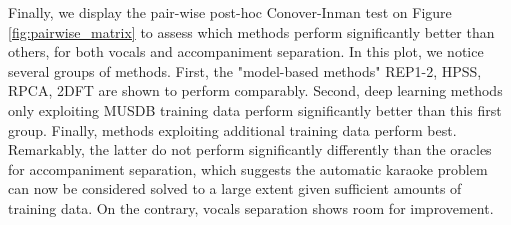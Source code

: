 \documentclass{llncs}
\begin{document}
Finally, we display the pair-wise post-hoc Conover-Inman test on Figure \ref{fig:pairwise_matrix} to assess which methods perform significantly better than others, for both vocals and accompaniment separation. In this plot, we notice several groups of methods. First, the "model-based methods" REP1-2, HPSS, RPCA, 2DFT are shown to perform comparably. Second, deep learning methods only exploiting MUSDB training data perform significantly better than this first group. Finally, methods exploiting additional training data perform best. Remarkably, the latter do not perform significantly differently than the oracles for accompaniment separation, which suggests the automatic karaoke problem can now be considered solved to a large extent given sufficient amounts of training data. On the contrary, vocals separation shows room for improvement.
\end{document}
